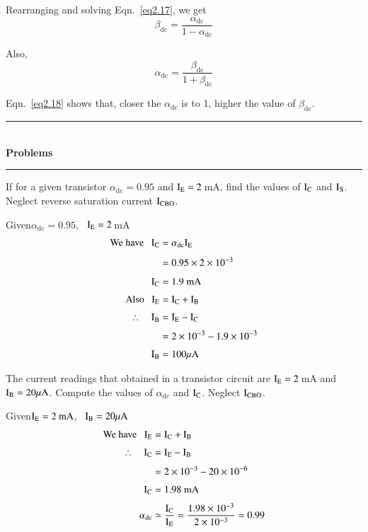 Rearranging and solving Eqn.~\eqref{eq2.17}, we get
\begin{equation}
\beta_{\text{dc}}=\dfrac{\alpha_{\text{dc}}}{1-\alpha_{\text{dc}}}\label{eq2.18}
\end{equation}

Also,
\begin{equation}
\alpha_{\text{dc}}=\dfrac{\beta_{\text{dc}}}{1+\beta_{\text{dc}}}\label{eq2.19}
\end{equation}

Eqn.~\eqref{eq2.18} shows that, closer the $\alpha_{\text{dc}}$ is to 1, higher the value of $\beta_{\text{dc}}$.

\begin{center}
\rule{4cm}{1pt}\\
{\bf\Large Problems}\\[-3pt]
\rule{4cm}{1pt}
\end{center}

\begin{problem}\label{prop2.1}
If for a given transistor $\alpha_{\text{dc}}=0.95$ and $\textrm{I}_{\textrm{E}}=2$\,mA, find the values of $\textrm{I}_{\textrm{C}}$ and $\textrm{I}_{\textrm{S}}$. Neglect reverse saturation current $\textrm{I}_{\text{CBO}}$.
\end{problem}

\begin{solution}
Given\quad $\alpha_{\text{dc}}=0.95$, \ $\textrm{I}_{\textrm{E}}=2$\,mA
\begin{align*}
\text{We have~~ } \textrm{I}_{\textrm{C}} &= \alpha_{\text{dc}}\textrm{I}_{\textrm{E}}\\[4pt]
&= 0.95\times 2\times 10^{-3}\\[4pt]
\textrm{I}_{\textrm{C}} &= 1.9\text{~mA}\\[3pt]
\text{Also~~ } \textrm{I}_{\textrm{E}} &= \textrm{I}_{\textrm{C}}+\textrm{I}_{\textrm{B}}\\[3pt]
\therefore\quad \textrm{I}_{\textrm{B}} &= \textrm{I}_{\textrm{E}}-\textrm{I}_{\textrm{C}}\\[3pt]
&= 2\times 10^{-3}-1.9\times 10^{-3}\\[3pt]
\textrm{I}_{\textrm{B}} &= 100\mu\textrm{A}
\end{align*}
\end{solution}

\begin{problem}\label{prob2.2}
The current readings that obtained in a transistor circuit are $\textrm{I}_{\textrm{E}}=2$\,mA and $\textrm{I}_{\textrm{B}}=20\mu\textrm{A}$. Compute the values of $\alpha_{\text{dc}}$ and $\textrm{I}_{\textrm{C}}$. Neglect $\textrm{I}_{\text{CBO}}$.
\end{problem}

\begin{solution}
Given\quad $\textrm{I}_{\textrm{E}}=2\text{~mA}$, \ $\textrm{I}_{\textrm{B}}=20\mu\textrm{A}$
\begin{align*}
\text{We have~~ } \textrm{I}_{\textrm{E}} &= \textrm{I}_{\textrm{C}}+\textrm{I}_{\textrm{B}}\\[3pt]
\therefore\quad \textrm{I}_{\textrm{C}} &= \textrm{I}_{\textrm{E}}-\textrm{I}_{\textrm{B}}\\[3pt]
&= 2\times 10^{-3}-20\times 10^{-6}\\[3pt]
\textrm{I}_{\textrm{C}} &= 1.98\text{~mA}\\[3pt]
\alpha_{\text{dc}} &\simeq \frac{\textrm{I}_{\textrm{C}}}{\textrm{I}_{\textrm{E}}}=\dfrac{1.98\times 10^{-3}}{2\times 10^{-3}}=0.99
\end{align*}
\end{solution}

